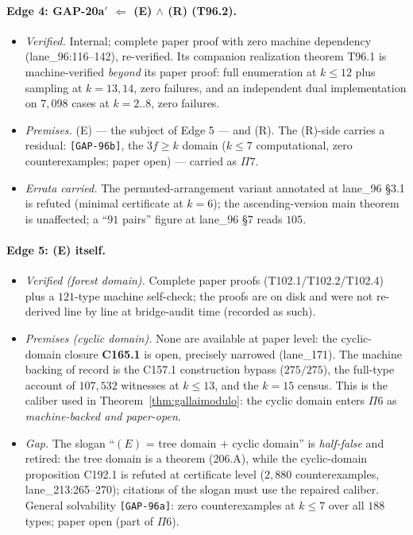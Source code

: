 \paragraph{Edge 4: GAP-20a$'$ $\Leftarrow$ (E) $\wedge$ (R) (T96.2).}
\begin{itemize}[leftmargin=2em,itemsep=0.1em]
\item \emph{Verified.} Internal; complete paper proof with zero machine dependency
(lane\_96:116--142), re-verified. Its companion realization theorem T96.1 is
machine-verified \emph{beyond} its paper proof: full enumeration at $k\le12$ plus sampling at
$k=13,14$, zero failures, and an independent dual implementation on $7{,}098$ cases at
$k=2..8$, zero failures.
\item \emph{Premises.} (E) --- the subject of Edge 5 --- and (R). The (R)-side carries a
residual: \texttt{[GAP-96b]}, the $3f\ge k$ domain ($k\le7$ computational, zero
counterexamples; paper open) --- carried as $\Pi7$.
\item \emph{Errata carried.} The permuted-arrangement variant annotated at lane\_96 \S3.1 is
refuted (minimal certificate at $k=6$); the ascending-version main theorem is unaffected; a
``$91$ pairs'' figure at lane\_96 \S7 reads $105$.
\end{itemize}

\paragraph{Edge 5: (E) itself.}
\begin{itemize}[leftmargin=2em,itemsep=0.1em]
\item \emph{Verified (forest domain).} Complete paper proofs (T102.1/T102.2/T102.4) plus a
$121$-type machine self-check; the proofs are on disk and were not re-derived line by line at
bridge-audit time (recorded as such).
\item \emph{Premises (cyclic domain).} None are available at paper level: the cyclic-domain
closure \textbf{C165.1} is open, precisely narrowed (lane\_171). The machine backing of
record is the C157.1 construction bypass ($275/275$), the full-type account of $107{,}532$
witnesses at $k\le13$, and the $k=15$ census. This is the caliber used in
Theorem~\ref{thm:gallaimodulo}: the cyclic domain enters $\Pi6$ as \emph{machine-backed and
paper-open}.
\item \emph{Gap.} The slogan ``$(E)$ = tree domain $+$ cyclic domain'' is \emph{half-false}
and retired: the tree domain is a theorem (206.A), while the cyclic-domain proposition
C192.1 is refuted at certificate level ($2{,}880$ counterexamples, lane\_213:265--270);
citations of the slogan must use the repaired caliber. General solvability
\texttt{[GAP-96a]}: zero counterexamples at $k\le7$ over all $188$ types; paper open (part of
$\Pi6$).
\end{itemize}

